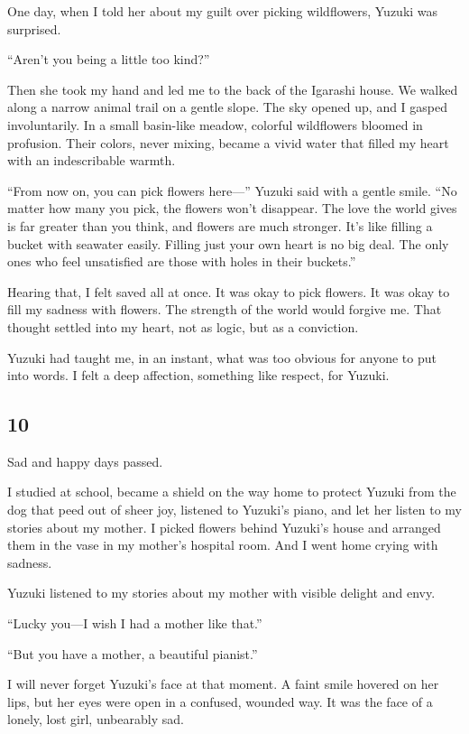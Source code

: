 \documentclass[
    a4paper,
    12pt,
    twoside,
    openany,
    UTF8,
    fontset=windows
]{ctexbook}
\begin{document}
One day, when I told her about my guilt over picking wildflowers, Yuzuki was surprised.

``Aren't you being a little too kind?''

Then she took my hand and led me to the back of the Igarashi house. We walked along a narrow animal trail on a gentle slope. The sky opened up, and I gasped involuntarily. In a small basin-like meadow, colorful wildflowers bloomed in profusion. Their colors, never mixing, became a vivid water that filled my heart with an indescribable warmth.

``From now on, you can pick flowers here---'' Yuzuki said with a gentle smile. ``No matter how many you pick, the flowers won't disappear. The love the world gives is far greater than you think, and flowers are much stronger. It's like filling a bucket with seawater easily. Filling just your own heart is no big deal. The only ones who feel unsatisfied are those with holes in their buckets.''

Hearing that, I felt saved all at once. It was okay to pick flowers. It was okay to fill my sadness with flowers. The strength of the world would forgive me. That thought settled into my heart, not as logic, but as a conviction.

Yuzuki had taught me, in an instant, what was too obvious for anyone to put into words. I felt a deep affection, something like respect, for Yuzuki.


\subsection*{10}

Sad and happy days passed.

I studied at school, became a shield on the way home to protect Yuzuki from the dog that peed out of sheer joy, listened to Yuzuki's piano, and let her listen to my stories about my mother. I picked flowers behind Yuzuki's house and arranged them in the vase in my mother's hospital room. And I went home crying with sadness.

Yuzuki listened to my stories about my mother with visible delight and envy.

``Lucky you---I wish I had a mother like that.''

``But you have a mother, a beautiful pianist.''

I will never forget Yuzuki's face at that moment. A faint smile hovered on her lips, but her eyes were open in a confused, wounded way. It was the face of a lonely, lost girl, unbearably sad.
\end{document}
